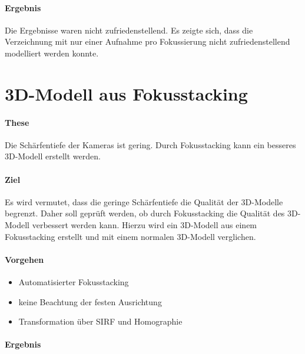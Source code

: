 \documentclass[./00PhotoBox.tex]{subfiles}
\begin{document}
\paragraph{Ergebnis}
Die Ergebnisse waren nicht zufriedenstellend. Es zeigte sich, dass die Verzeichnung mit nur einer Aufnahme pro Fokussierung nicht zufriedenstellend modelliert werden konnte.


\section{3D-Modell aus Fokusstacking}
\label{sec:fokusstacking}

\paragraph{These}
Die Schärfentiefe der Kameras ist gering. Durch Fokusstacking kann ein besseres 3D-Modell erstellt werden.

\paragraph{Ziel}
Es wird vermutet, dass die geringe Schärfentiefe die Qualität der 3D-Modelle begrenzt. Daher soll geprüft werden, ob durch Fokusstacking die Qualität des 3D-Modell verbessert werden kann. Hierzu wird ein 3D-Modell aus einem Fokusstacking erstellt und mit einem normalen 3D-Modell verglichen.

\paragraph{Vorgehen}
\begin{itemize}
    \item Automatisierter Fokusstacking
    \item keine Beachtung der festen Ausrichtung
    \item Transformation über SIRF und Homographie
\end{itemize}

\paragraph{Ergebnis}

\biblio
\end{document}
